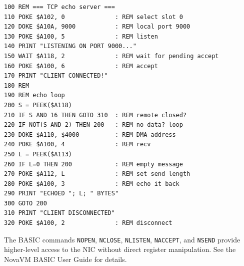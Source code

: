 \begin{lstlisting}
100 REM === TCP echo server ===
110 POKE $A102, 0              : REM select slot 0
120 DOKE $A10A, 9000           : REM local port 9000
130 POKE $A100, 5              : REM listen
140 PRINT "LISTENING ON PORT 9000..."
150 WAIT $A118, 2              : REM wait for pending accept
160 POKE $A100, 6              : REM accept
170 PRINT "CLIENT CONNECTED!"
180 REM
190 REM echo loop
200 S = PEEK($A118)
210 IF S AND 16 THEN GOTO 310  : REM remote closed?
220 IF NOT(S AND 2) THEN 200   : REM no data? loop
230 DOKE $A110, $4000          : REM DMA address
240 POKE $A100, 4              : REM recv
250 L = PEEK($A113)
260 IF L=0 THEN 200            : REM empty message
270 POKE $A112, L              : REM set send length
280 POKE $A100, 3              : REM echo it back
290 PRINT "ECHOED "; L; " BYTES"
300 GOTO 200
310 PRINT "CLIENT DISCONNECTED"
320 POKE $A100, 2              : REM disconnect
\end{lstlisting}

\begin{tipbox}
The BASIC commands \texttt{NOPEN}, \texttt{NCLOSE}, \texttt{NLISTEN},
\texttt{NACCEPT}, and \texttt{NSEND} provide higher-level access to the NIC
without direct register manipulation.  See the NovaVM BASIC User Guide for
details.
\end{tipbox}
